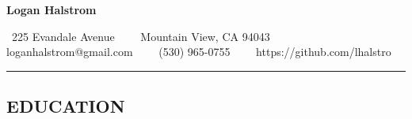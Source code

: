 \documentclass[letterpaper,MMMyyyy,nonstop]{simpleresumecv}
\makeatletter
\newcommand{\CVAuthor}{Logan Halstrom}
\newcommand{\CVWebpage}{https://github.com/lhalstro}
\newcommand{\CVEmail}{loganhalstrom@gmail.com}
\newcommand{\CVPhone}{(530) 965-0755}
\newcommand{\CVAddressStreet}{225 Evandale Avenue}
\newcommand{\CVAddressCity}{Mountain View, CA 94043}
\makeatother
\begin{document}

\begin{center}
    {\LARGE \textbf{\CVAuthor}}

    \ \CVAddressStreet\ \ \textbullet
    \ \ \CVAddressCity
    \\
    \hspace{1.7em} \CVEmail\ \ \textbullet
               \ \ \CVPhone\ \ \textbullet
               \ \ \CVWebpage
\end{center}



\hrule
\vspace{-0.4em}
\subsection*{EDUCATION}
\end{document}
